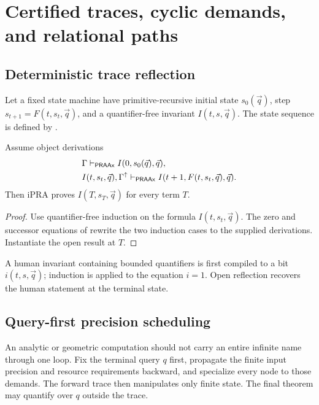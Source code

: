 \section{Certified traces, cyclic demands, and relational paths}
\label{sec:traces}

\subsection{Deterministic trace reflection}

Let a fixed state machine have primitive-recursive initial state
\(s_0(\vec q)\), step
\(s_{t+1}=F(t,s_t,\vec q)\), and a quantifier-free invariant
\(I(t,s,\vec q)\).  The state sequence is defined by .

\begin{theorem}
\label{thm:trace}
Assume object derivations
\begin{align*}
 &\Gamma\mathrel{\vdash_{\mathsf{PRAAx}}} I(0,s_0(\vec q),\vec q),\\
 &I(t,s_t,\vec q),\Gamma^{\mathord{\uparrow}}
     \mathrel{\vdash_{\mathsf{PRAAx}}} I(t+1,F(t,s_t,\vec q),\vec q).
\end{align*}
Then iPRA proves \(I(T,s_T,\vec q)\) for every term \(T\).
\end{theorem}

\begin{proof}
Use quantifier-free induction on the formula
\(I(t,s_t,\vec q)\).  The zero and successor equations of 
rewrite the two induction cases to the supplied derivations.  Instantiate the
open result at \(T\).
\end{proof}

A human invariant containing bounded quantifiers is first compiled to a bit
\(i(t,s,\vec q)\); induction is applied to the equation \(i=1\).  Open
reflection recovers the human statement at the terminal state.

\subsection{Query-first precision scheduling}

An analytic or geometric computation should not carry an entire infinite name
through one loop.  Fix the terminal query \(q\) first, propagate the finite
input precision and resource requirements backward, and specialize every node
to those demands.  The forward trace then manipulates only finite state.  The
final theorem may quantify over \(q\) outside the trace.

